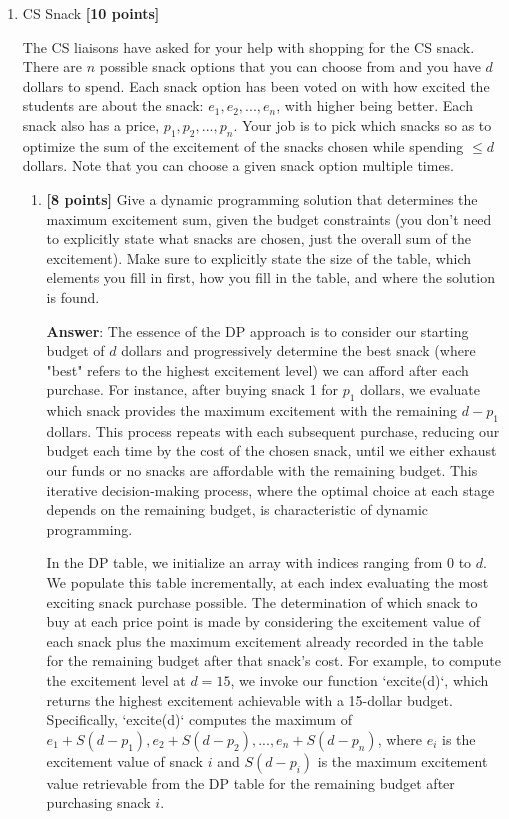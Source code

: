 \documentclass[11pt]{article}
\begin{document}
\begin{enumerate}

\item CS Snack \textbf{[10 points]} 

The CS liaisons have asked for your help with shopping for the CS snack. There are $n$ possible snack options that you can choose from and you have $d$ dollars to spend.  Each snack option has been voted on with how excited the students are about the snack: $e_1, e_2, ..., e_n$, with higher being better.  Each snack also has a price, $p_1, p_2, ..., p_n$. Your job is to pick which snacks so as to optimize the sum of the excitement of the snacks chosen while spending $\le d$ dollars.  Note that you can choose a given snack option multiple times.

\begin{enumerate}

\item \textbf{[8 points]} Give a dynamic programming solution that determines the maximum excitement sum, given the budget constraints (you don't need to explicitly state what snacks are chosen, just the overall sum of the excitement).  Make sure to explicitly state the size of the table, which elements you fill in first, how you fill in the table, and where the solution is found.

\textbf{Answer}:
The essence of the DP approach is to consider our starting budget of \( d \) dollars and progressively determine the best snack (where "best" refers to the highest excitement level) we can afford after each purchase. For instance, after buying snack 1 for \( p_1 \) dollars, we evaluate which snack provides the maximum excitement with the remaining \( d-p_1 \) dollars. This process repeats with each subsequent purchase, reducing our budget each time by the cost of the chosen snack, until we either exhaust our funds or no snacks are affordable with the remaining budget. This iterative decision-making process, where the optimal choice at each stage depends on the remaining budget, is characteristic of dynamic programming.

In the DP table, we initialize an array with indices ranging from 0 to \( d \). We populate this table incrementally, at each index evaluating the most exciting snack purchase possible. The determination of which snack to buy at each price point is made by considering the excitement value of each snack plus the maximum excitement already recorded in the table for the remaining budget after that snack's cost. For example, to compute the excitement level at \( d=15 \), we invoke our function `excite(d)`, which returns the highest excitement achievable with a 15-dollar budget. Specifically, `excite(d)` computes the maximum of \( e_1 + S(d-p_1), e_2 + S(d-p_2), ..., e_n + S(d-p_n) \), where \( e_i \) is the excitement value of snack \( i \) and \( S(d-p_i) \) is the maximum excitement value retrievable from the DP table for the remaining budget after purchasing snack \( i \).


\end{enumerate}
\end{enumerate}
\end{document}
